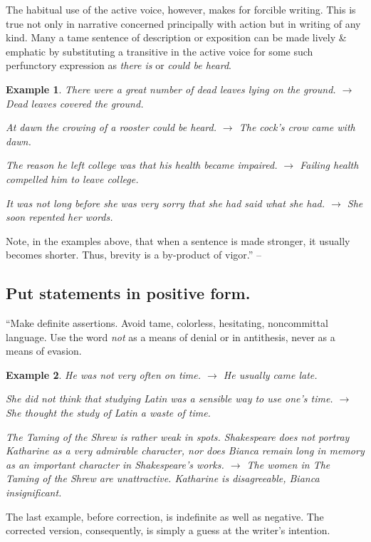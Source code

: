 \documentclass{article}
\numberwithin{equation}{section}
\newtheorem{example}{Example}[section]
\begin{document}
The habitual use of the active voice, however, makes for forcible writing. This is true not only in narrative concerned principally with action but in writing of any kind. Many a tame sentence of description or exposition can be made lively \& emphatic by substituting a transitive in the active voice for some such perfunctory expression as \textit{there is} or \textit{could be heard}.
\begin{example}
	There were a great number of dead leaves lying on the ground. $\to$ Dead leaves covered the ground.
	
	At dawn the crowing of a rooster could be heard. $\to$ The cock's crow came with dawn.
	
	The reason he left college was that his health became impaired. $\to$ Failing health compelled him to leave college.
	
	It was not long before she was very sorry that she had said what she had. $\to$ She soon repented her words.
\end{example}
Note, in the examples above, that when a sentence is made stronger, it usually becomes shorter. Thus, brevity is a by-product of vigor.'' -- \cite[p. 32]{Strunk_White2019}


\subsection{Put statements in positive form.}
``Make definite assertions. Avoid tame, colorless, hesitating, noncommittal language. Use the word \textit{not} as a means of denial or in antithesis, never as a means of evasion.
\begin{example}
	He was not very often on time. $\to$ He usually came late.
	
	She did not think that studying Latin was a sensible way to use one's time. $\to$ She thought the study of Latin a waste of time.
	
	\emph{The Taming of the Shrew} is rather weak in spots. Shakespeare does not portray Katharine as a very admirable character, nor does Bianca remain long in memory as an important character in Shakespeare's works. $\to$ The women in \emph{The Taming of the Shrew} are unattractive. Katharine is disagreeable, Bianca insignificant.
\end{example}
The last example, before correction, is indefinite as well as negative. The corrected version, consequently, is simply a guess at the writer's intention.
\end{document}
